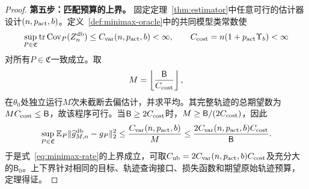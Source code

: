 \begin{proof}
\par\smallskip\noindent\textbf{第五步：匹配预算的上界。}\quad
固定定理~\ref{thm:estimator}中任意可行的估计器设计$(n,p_{\rm act},b)$。定义~\ref{def:minimax-oracle}中的共同模型类常数使
\[
 \sup_{P\in\mathfrak C}\operatorname{tr}\operatorname{Cov}_P(Z_n^{\mathrm{db}})\le C_{\rm var}(n,p_{\rm act},b)<\infty,
 \qquad
 C_{\rm cost}=n(1+p_{\rm act} \Upsilon_b)<\infty
\]
对所有$P\in\mathfrak C$一致成立。取
\[
 M=\left\lfloor\frac{\mathsf B}{C_{\rm cost}}\right\rfloor,
\]
在$\theta_0$处独立运行$M$次未截断去偏估计，并求平均。其完整轨迹的总期望数为$MC_{\rm cost}\le\mathsf B$，故该程序可行。当$\mathsf B\ge2C_{\rm cost}$时，$M\ge \mathsf B/(2C_{\rm cost})$，因此
\[
 \sup_{P\in\mathfrak C}
 \mathbb E_P\lVert\widehat g_{M,n}^{\mathrm{db}}-g_P\rVert_2^2
 \le\frac{C_{\rm var}(n,p_{\rm act},b)}{M}
 \le\frac{2C_{\rm var}(n,p_{\rm act},b)C_{\rm cost}}{\mathsf B}.
\]
于是式~\eqref{eq:minimax-rate}的上界成立，可取$C_{\rm ub}=2C_{\rm var}(n,p_{\rm act},b)C_{\rm cost}$及充分大的$\mathsf B_0$。上下界针对相同的目标、轨迹查询接口、损失函数和期望原始轨迹预算，定理得证。
\end{proof}
